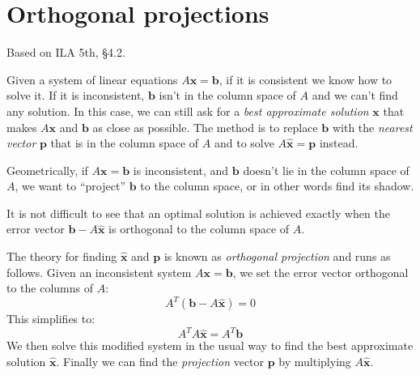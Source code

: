 \documentclass[11pt,oneside]{amsbook}
\theoremstyle{definition}
\theoremstyle{plain}
\theoremstyle{definition}
\theoremstyle{remark}
\numberwithin{equation}{section}
\numberwithin{figure}{section}
\begin{document}
\newpage
\section{Orthogonal projections}

Based on ILA 5th, \S 4.2.

Given a system of linear equations $A\bm{x}=\bm{b}$, if it is consistent we know how to solve it. If it is inconsistent, $\bm{b}$ isn't in the column space of $A$ and we can't find any solution. In this case, we can still ask for a \emph{best approximate solution} $\bm{x}$ that makes $A\bm{x}$ and $\bm{b}$ as close as possible. The method is to replace $\bm{b}$ with the \emph{nearest vector} $\bm{p}$ that is in the column space of $A$ and to solve $A\hat{\bm{x}}=\bm{p}$ instead.

Geometrically, if $A\bm{x}=\bm{b}$ is inconsistent, and $\bm{b}$ doesn't lie in the column space of $A$, we want to ``project'' $\bm{b}$ to the column space, or in other words find its shadow.

\begin{figure}[h]
  [Picture]
\end{figure}

It is not difficult to see that an optimal solution is achieved exactly when the error vector $\bm{b}-A\hat{\bm{x}}$ is orthogonal to the column space of $A$.

The theory for finding $\hat{\bm{x}}$ and $\bm{p}$ is known as \emph{orthogonal projection} and runs as follows. Given an inconsistent system $A\bm{x}=\bm{b}$, we set the error vector orthogonal to the columns of $A$:
\[A^T(\bm{b}-A\hat{\bm{x}})=0
\]
This simplifies to:
\[A^TA\hat{\bm{x}}=A^T\bm{b}
\]
We then solve this modified system in the usual way to find the best approximate solution $\hat{\bm{x}}$. Finally we can find the \emph{projection} vector $\bm{p}$ by multiplying $A\hat{\bm{x}}$.
\end{document}
